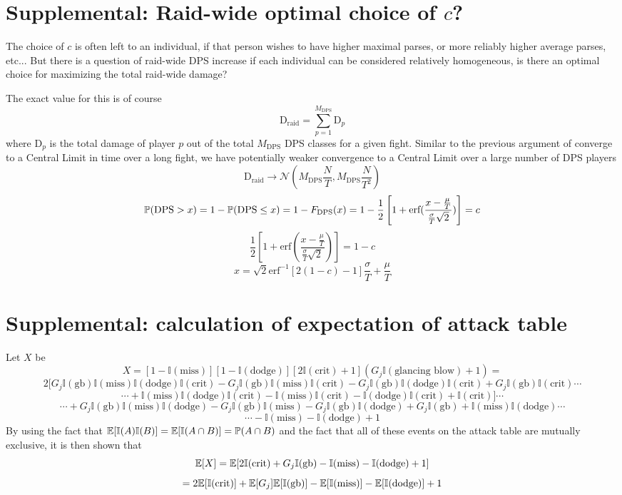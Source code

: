 \section*{Supplemental: Raid-wide optimal choice of $c$?}
%
The choice of $c$ is often left to an individual, if that person wishes to have higher maximal parses, or more reliably higher average parses, etc... But there is a question of raid-wide DPS increase if each individual can be considered relatively homogeneous, is there an optimal choice for maximizing the total raid-wide damage?

The exact value for this is of course
%
$$
\text{D}_\text{raid} = \sum_{p=1}^{M_\text{DPS}} \text{D}_p
$$
%
where $\text{D}_p$ is the total damage of player $p$ out of the total $M_\text{DPS}$ DPS classes for a given fight. Similar to the previous argument of converge to a Central Limit in time over a long fight, we have potentially weaker convergence to a Central Limit over a large number of DPS players
%
$$
\text{D}_\text{raid} \rightarrow \mathcal{N}(M_\text{DPS} \frac{N}{T}, M_\text{DPS} \frac{N}{T^2})
$$
$$
\P(\text{DPS} > x) = 1 - \P(\text{DPS} \leq x)
= 1 - F_\text{DPS}(x)
= 1 - \frac{1}{2} \left[ 1 + \text{erf}(\frac{ x - \frac{\mu}{T} }{ \frac{\sigma}{T} \sqrt{2} }) \right] = c
$$
%
$$
\frac{1}{2} \left[ 1 + \text{erf}(\frac{ x - \frac{\mu}{T} }{ \frac{\sigma}{T} \sqrt{2} }) \right] = 1 - c
$$
$$
x = \sqrt{2} \text{erf}^{-1} \left[ 2 (1 - c) - 1 \right] \frac{\sigma}{T} + \frac{\mu}{T}
$$



\section*{Supplemental: calculation of expectation of attack table}
%
Let $X$ be
%
$$
X = [1 - \mathbb{I}(\text{miss})] [1 - \mathbb{I}(\text{dodge})] [2 \mathbb{I}(\text{crit}) + 1] (G_j \mathbb{I}(\text{glancing blow}) + 1) =
$$
$$
2 [G_j \mathbb{I}(\text{gb}) \mathbb{I}(\text{miss}) \mathbb{I}(\text{dodge}) \mathbb{I}(\text{crit}) - G_j \mathbb{I}(\text{gb}) \mathbb{I}(\text{miss}) \mathbb{I}(\text{crit}) - G_j \mathbb{I}(\text{gb}) \mathbb{I}(\text{dodge}) \mathbb{I}(\text{crit}) +  G_j \mathbb{I}(\text{gb}) \mathbb{I}(\text{crit}) \cdots
$$
$$
\cdots + \mathbb{I}(\text{miss}) \mathbb{I}(\text{dodge}) \mathbb{I}(\text{crit}) - \mathbb{I}(\text{miss}) \mathbb{I}(\text{crit}) - \mathbb{I}(\text{dodge}) \mathbb{I}(\text{crit}) + \mathbb{I}(\text{crit})] \cdots
$$
$$
\cdots + G_j \mathbb{I}(\text{gb}) \mathbb{I}(\text{miss}) \mathbb{I}(\text{dodge}) - G_j \mathbb{I}(\text{gb}) \mathbb{I}(\text{miss}) - G_j \mathbb{I}(\text{gb}) \mathbb{I}(\text{dodge}) + G_j \mathbb{I}(\text{gb}) + \mathbb{I}(\text{miss}) \mathbb{I}(\text{dodge}) \cdots
$$
$$
\cdots - \mathbb{I}(\text{miss}) - \mathbb{I}(\text{dodge}) + 1
$$
%
By using the fact that $\E[\mathbb{I}(A) \mathbb{I}(B)] = \E[\mathbb{I}(A \cap B)] = \P(A \cap B)$ and the fact that all of these events on the attack table are mutually exclusive, it is then shown that
%
$$
\E[X] = \E[ 2 \mathbb{I}(\text{crit}) + G_j \mathbb{I}(\text{gb}) - \mathbb{I}(\text{miss}) - \mathbb{I}(\text{dodge}) + 1]
$$
$$
= 2 \E[ \mathbb{I}(\text{crit})] + \E[G_j] \E[\mathbb{I}(\text{gb})] - \E[\mathbb{I}(\text{miss})] - \E[\mathbb{I}(\text{dodge})] + 1
$$


